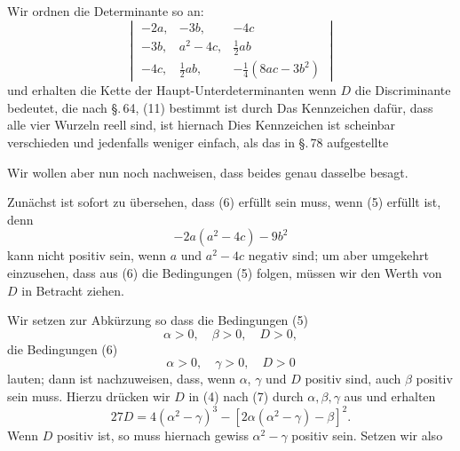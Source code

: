 Wir ordnen die Determinante so an:
\[
\begin{vmatrix}
-2a, & -3b, & -4c \\
-3b, & a^2 - 4c, & \tfrac{1}{2} a b \\
-4c, & \tfrac{1}{2} a b, & -\tfrac{1}{4} (8ac - 3b^2)
\end{vmatrix}
\]
und erhalten die Kette der Haupt-Unterdeterminanten
wenn $D$ die Discriminante bedeutet, die nach \S.\,64, (11) bestimmt ist durch
Das Kennzeichen dafür, dass alle vier Wurzeln reell sind, ist hiernach
Dies Kennzeichen ist scheinbar verschieden und jedenfalls weniger einfach, als das in \S.\,78 aufgestellte

Wir wollen aber nun noch nachweisen, dass beides genau dasselbe besagt.

Zunächst ist sofort zu übersehen, dass (6) erfüllt sein muss, wenn (5) erfüllt ist, denn
\[
- 2a(a^2 - 4c) - 9b^2
\]
kann nicht positiv sein, wenn $a$ und $a^2 - 4c$ negativ sind; um aber umgekehrt einzusehen, dass aus (6) die Bedingungen (5) folgen, müssen wir den Werth von $D$ in Betracht ziehen.

Wir setzen zur Abkürzung
so dass die Bedingungen (5)
\[
\alpha > 0, \quad \beta > 0, \quad D > 0,
\]
die Bedingungen (6)
\[
\alpha > 0, \quad \gamma > 0, \quad D > 0
\]
lauten; dann ist nachzuweisen, dass, wenn $\alpha$, $\gamma$ und $D$ positiv sind, auch $\beta$ positiv sein muss. Hierzu drücken wir $D$ in (4) nach (7) durch $\alpha, \beta, \gamma$ aus und erhalten
\[
27 D = 4(\alpha^2 - \gamma)^3 - [2\alpha(\alpha^2 - \gamma) - \beta]^2.
\]
Wenn $D$ positiv ist, so muss hiernach gewiss $\alpha^2 - \gamma$ positiv sein. Setzen wir also
